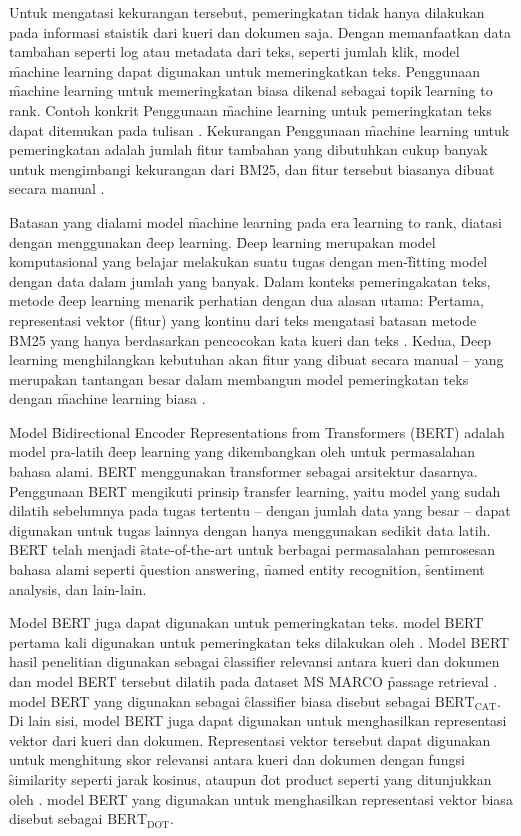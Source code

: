 Untuk mengatasi kekurangan tersebut, pemeringkatan tidak hanya dilakukan pada informasi staistik dari kueri dan dokumen saja. Dengan memanfaatkan data tambahan seperti log atau metadata dari teks, seperti jumlah klik, model \f{machine learning} dapat digunakan untuk memeringkatkan teks. Penggunaan \f{machine learning} untuk memeringkatan biasa dikenal sebagai topik \f{learning to rank}. Contoh konkrit Penggunaan \f{machine learning} untuk pemeringkatan teks dapat ditemukan pada tulisan \cite{letorhendri}. Kekurangan Penggunaan \f{machine learning} untuk pemeringkatan adalah jumlah fitur tambahan yang dibutuhkan cukup banyak untuk mengimbangi kekurangan dari BM25, dan fitur tersebut biasanya dibuat secara manual \citep{textrankingsurvey}.

Batasan yang dialami model \f{machine learning} pada era \f{learning to rank}, diatasi dengan menggunakan \f{deep learning}. \f{Deep learning} merupakan model komputasional yang belajar melakukan suatu tugas dengan men-\f{fitting} model dengan data dalam jumlah yang banyak. Dalam konteks pemeringakatan teks, metode \f{deep learning} menarik perhatian dengan dua alasan utama: Pertama, representasi vektor (fitur) yang kontinu dari teks mengatasi batasan metode BM25 yang hanya berdasarkan pencocokan kata kueri dan teks \citep{irlecture}. Kedua, \f{Deep learning} menghilangkan kebutuhan akan fitur yang dibuat secara manual -- yang merupakan tantangan besar dalam membangun model pemeringkatan teks dengan \f{machine learning} biasa \citep{irlecture}.

Model \f{Bidirectional Encoder Representations from Transformers} (BERT) adalah model pra-latih \f{deep learning} yang dikembangkan oleh \cite{bertori} untuk permasalahan bahasa alami. BERT menggunakan \f{transformer} \citep{transformerori} sebagai arsitektur dasarnya. Penggunaan BERT mengikuti prinsip \f{transfer learning}, yaitu model yang sudah dilatih sebelumnya pada tugas tertentu -- dengan jumlah data yang besar -- dapat digunakan untuk tugas lainnya dengan hanya menggunakan sedikit data latih. BERT telah menjadi \f{state-of-the-art} untuk berbagai permasalahan pemrosesan bahasa alami seperti \f{question answering}, \f{named entity recognition}, \f{sentiment analysis}, dan lain-lain.

Model BERT juga dapat digunakan untuk pemeringkatan teks. model BERT pertama kali digunakan untuk pemeringkatan teks dilakukan oleh \cite{firstRerankingBert}. Model BERT hasil penelitian \cite{firstRerankingBert} digunakan sebagai \f{classifier} relevansi antara kueri dan dokumen dan model BERT tersebut dilatih pada \f{dataset} MS MARCO \f{passage retrieval} \citep{msmarco}. model BERT yang digunakan sebagai \f{classifier} biasa disebut sebagai $\text{BERT}_{\text{CAT}}$. Di lain sisi, model BERT juga dapat digunakan untuk menghasilkan representasi vektor dari kueri dan dokumen. Representasi vektor tersebut dapat digunakan untuk menghitung skor relevansi antara kueri dan dokumen dengan fungsi \f{similarity} seperti jarak kosinus, ataupun \f{dot product} seperti yang ditunjukkan oleh \cite{dprmeta,reimers-2019-sentence-bert}. model BERT yang digunakan untuk menghasilkan representasi vektor biasa disebut sebagai $\text{BERT}_{\text{DOT}}$. 

